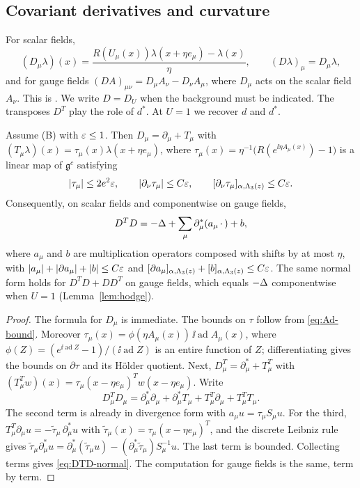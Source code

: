 \subsection{Covariant derivatives and curvature}\label{ss:12.3}

For scalar fields,
\[
(D_\mu\lambda)(x)=\frac{R(U_\mu(x))\lambda(x+\eta e_\mu)-\lambda(x)}\eta,\qquad (D\lambda)_\mu=D_\mu\lambda,
\]
and for gauge fields $(DA)_{\mu\nu}=D_\mu A_\nu-D_\nu A_\mu$, where $D_\mu$ acts on the scalar field $A_\nu$. This is \cite[(3.3), (3.4)]{BalBackground}. We write $D=D_U$ when the background must be indicated. The transposes $D^T$ play the role of $d^*$. At $U=1$ we recover $d$ and $d^*$.

\begin{lemma}\label{lem:cov-expansion}
Assume (B) with $\varepsilon\le1$. Then $D_\mu=\partial_\mu+T_\mu$ with $(T_\mu\lambda)(x)=\tau_\mu(x)\lambda(x+\eta e_\mu)$, where $\tau_\mu(x)=\eta^{-1}\big(R(e^{\ii\eta A_\mu(x)})-1\big)$ is a linear map of $\mathfrak g^c$ satisfying
\[
|\tau_\mu|\le 2e^2\varepsilon,\qquad|\partial_\nu\tau_\mu|\le C\varepsilon,\qquad[\partial_\nu\tau_\mu]_{\alpha,\Lambda_3(z)}\le C\varepsilon .
\]
Consequently, on scalar fields and componentwise on gauge fields,
\begin{equation}\label{eq:DTD-normal}
D^TD=-\Delta+\sum_\mu\partial^*_\mu(a_\mu\,\cdot\,)+b,
\end{equation}
where $a_\mu$ and $b$ are multiplication operators composed with shifts by at most $\eta$, with $|a_\mu|+|\partial a_\mu|+|b|\le C\varepsilon$ and $[\partial a_\mu]_{\alpha,\Lambda_3(z)}+[b]_{\alpha,\Lambda_3(z)}\le C\varepsilon$. The same normal form holds for $D^TD+DD^T$ on gauge fields, which equals $-\Delta$ componentwise when $U=1$ (Lemma~\ref{lem:hodge}).
\end{lemma}

\begin{proof}
The formula for $D_\mu$ is immediate. The bounds on $\tau$ follow from \eqref{eq:Ad-bound}. Moreover $\tau_\mu(x)=\phi(\eta A_\mu(x))\,\ii\operatorname{ad}A_\mu(x)$, where $\phi(Z)=(e^{\ii\operatorname{ad}Z}-1)/(\ii\operatorname{ad}Z)$ is an entire function of $Z$; differentiating gives the bounds on $\partial\tau$ and its H\"older quotient. Next, $D^T_\mu=\partial^*_\mu+T^T_\mu$ with $(T^T_\mu w)(x)=\tau_\mu(x-\eta e_\mu)^Tw(x-\eta e_\mu)$. Write
\[
D^T_\mu D_\mu=\partial^*_\mu\partial_\mu+\partial^*_\mu T_\mu+T_\mu^T\partial_\mu+T^T_\mu T_\mu .
\]
The second term is already in divergence form with $a_\mu u=\tau_\mu S_\mu u$. For the third, $T^T_\mu\partial_\mu u=-\tilde\tau_\mu\,\partial^*_\mu u$ with $\tilde\tau_\mu(x)=\tau_\mu(x-\eta e_\mu)^T$, and the discrete Leibniz rule gives $\tilde\tau_\mu\partial^*_\mu u=\partial^*_\mu(\tilde\tau_\mu u)-(\partial^*_\mu\tilde\tau_\mu)S_\mu^{-1}u$. The last term is bounded. Collecting terms gives \eqref{eq:DTD-normal}. The computation for gauge fields is the same, term by term.
\end{proof}


